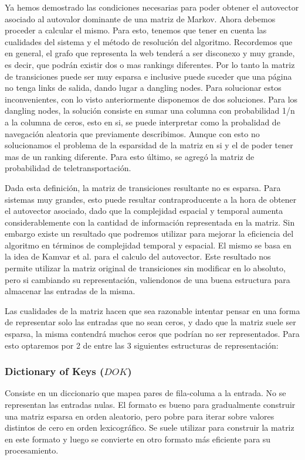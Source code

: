 Ya hemos demostrado las condiciones necesarias para poder obtener el autovector asociado al autovalor dominante de una matriz de Markov. 
Ahora debemos proceder a calcular el mismo. Para esto, tenemos que tener en cuenta las cualidades del sistema y el método de resolución del algoritmo. Recordemos que en general, el grafo que representa la web tenderá a ser disconexo y muy grande, es decir, que podrán existir dos o mas rankings diferentes. Por lo tanto la matriz 
de transiciones puede ser muy esparsa e inclusive puede suceder que una página no tenga links de salida, dando lugar a dangling nodes. Para solucionar estos inconvenientes, con lo visto anteriormente disponemos de dos soluciones. Para los dangling nodes, la solución consiste en sumar una columna con probabilidad 1/n a la columna de ceros, esto en si, se puede interpretar como la probalidad de navegación aleatoria que previamente describimos. Aunque con esto no solucionamos el problema de la esparsidad de la matriz en si y el de poder tener mas de un ranking diferente. Para esto último, se agregó la matriz de probabilidad de teletransportación.

Dada esta definición, la matriz de transiciones resultante no es esparsa. 
Para sistemas muy grandes, esto puede resultar contraproducente a la hora de obtener el autovector asociado, dado que la complejidad espacial y temporal aumenta  considerablemente con la cantidad de información representada en la matriz. Sin embargo existe un resultado que podremos utilizar para mejorar la eficiencia del algoritmo en términos de complejidad temporal y espacial. El mismo se basa en la idea de Kamvar et al. \cite[Algoritmo 1]{Kamvar2003} para el calculo del autovector. Este resultado nos permite utilizar la matriz original de transiciones sin modificar en lo absoluto, pero si cambiando su representación, valiendonos de una buena estructura para almacenar las entradas de la misma. 

Las cualidades de la matriz hacen que sea razonable intentar pensar en una forma de representar solo las entradas que no sean ceros, y dado que la matriz suele ser esparsa, la misma contendrá muchos ceros que podrían no ser representados. Para esto optaremos por 2 de entre las 3 siguientes estructuras de representación:

\subsubsection{Dictionary of Keys ($DOK$)}

Consiste en un diccionario que mapea pares de fila-columa a la entrada. No se representan las entradas nulas. El formato es bueno para gradualmente construir una matriz esparsa en orden aleatorio, pero pobre para iterar sobre valores distintos de cero en orden lexicográfico. Se suele utilizar para construir la matriz en este formato y luego se convierte en otro formato más eficiente para su procesamiento.

